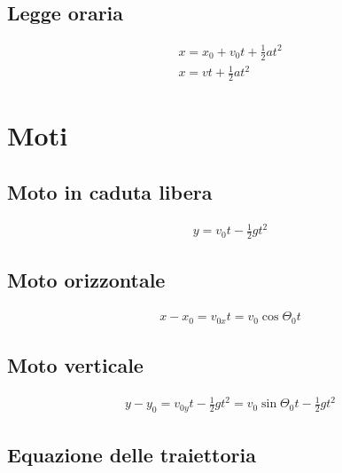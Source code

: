 \documentclass{article}
\begin{document}
\subsection{Legge oraria}
\label{sec:leggeoraria}

\begin{eqnarray}
  \label{eq:leggeo}
  x=x_0+v_0t + \frac{1}{2} at^2\\
  x=vt+\frac{1}{2} at^2
\end{eqnarray}


\section{Moti}
\label{sec:moti}
\subsection{Moto in caduta libera}
\label{sec:motocadutalibera}

\begin{eqnarray}
  \label{eq:cadutalibera}
  y=v_0t-\frac{1}{2}gt^2
\end{eqnarray}

\subsection{Moto orizzontale}
\label{sec:motooriz}

\begin{eqnarray}
  \label{eq:motooriz}
  x-x_0=v_{0x}t=v_0\cos\Theta_0t
\end{eqnarray}

\subsection{Moto verticale}
\label{sec:motovert}

\begin{eqnarray}
  \label{eq:motovert}
  y-y_0=v_{0y}t-\frac{1}{2}gt^2=v_0\sin \Theta_0t-\frac{1}{2}gt^2
\end{eqnarray}

\subsection{Equazione delle traiettoria}
\label{sec:eqtrai}
\end{document}
